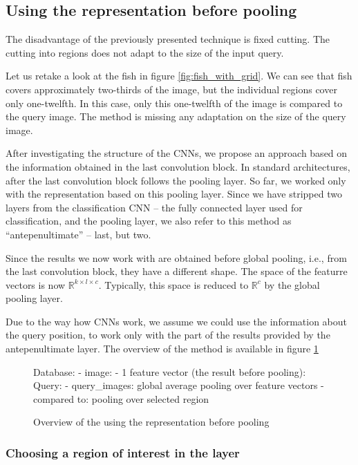 \subsection{Using the representation before pooling}

The disadvantage of the previously presented technique is fixed cutting. The cutting into regions does not adapt to the size of the input query. 

Let us retake a look at the fish in figure \ref{fig:fish_with_grid}. We can see that fish covers approximately two-thirds of the image, but the individual regions cover only one-twelfth. In this case, only this one-twelfth of the image is compared to the query image. The method is missing any adaptation on the size of the query image.

After investigating the structure of the CNNs, we propose an approach based on the information obtained in the last convolution block. In standard architectures, after the last convolution block follows the pooling layer. So far, we worked only with the representation based on this pooling layer. Since we have stripped two layers from the classification CNN -- the fully connected layer used for classification, and the pooling layer, we also refer to this method as ``antepenultimate'' -- last, but two.

Since the results we now work with are obtained before global pooling, i.e., from the last convolution block, they have a different shape. The space of the featurre vectors is now $\mathbb{R}^{k\times l \times c}$. Typically, this space is reduced to $\mathbb{R}^c$ by the global pooling layer.

Due to the way how CNNs work, we assume we could use the information about the query position, to work only with the part of the results provided by the antepenultimate layer. The overview of the method is available in figure \ref{fig:antepenultimate_overview}

\begin{figure}
\centering
\begin{boxedverbatim}
Database:
    - image:
        - 1 feature vector (the result before pooling):
Query:
    - query_images: global average pooling over feature vectors
    - compared to: pooling over selected region
\end{boxedverbatim}
\caption{Overview of the using the representation before pooling}
\label{fig:antepenultimate_overview}
\end{figure}


\subsubsection{Choosing a region of interest in the layer}

